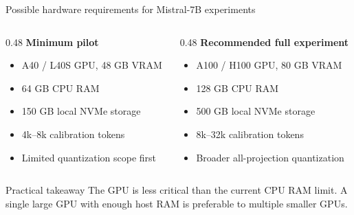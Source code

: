 \documentclass[aspectratio=169]{beamer}
\begin{document}
\begin{frame}{Possible hardware requirements for Mistral-7B experiments}
\begin{columns}[T]
\begin{column}{0.48\textwidth}
\textbf{Minimum pilot}
\begin{itemize}
    \item A40 / L40S GPU, 48 GB VRAM
    \item 64 GB CPU RAM
    \item 150 GB local NVMe storage
    \item 4k--8k calibration tokens
    \item Limited quantization scope first
\end{itemize}
\end{column}

\begin{column}{0.48\textwidth}
\textbf{Recommended full experiment}
\begin{itemize}
    \item A100 / H100 GPU, 80 GB VRAM
    \item 128 GB CPU RAM
    \item 500 GB local NVMe storage
    \item 8k--32k calibration tokens
    \item Broader all-projection quantization
\end{itemize}
\end{column}
\end{columns}

\vspace{0.25cm}
\begin{block}{Practical takeaway}
The GPU is less critical than the current CPU RAM limit. 
A single large GPU with enough host RAM is preferable to multiple smaller GPUs.
\end{block}
\end{frame}

\end{document}
